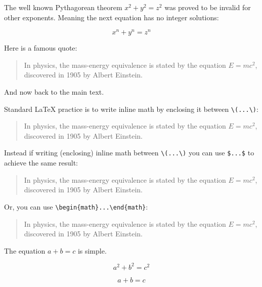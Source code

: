 \documentclass[12pt, letterpaper]{article}
\begin{document}
\newpage


The well known Pythagorean theorem \(x^2 + y^2 = z^2\) was 
proved to be invalid for other exponents. 
Meaning the next equation has no integer solutions:

\[ x^n + y^n = z^n \]


Here is a famous quote:

\begin{quote}
In physics, the mass-energy equivalence is stated 
by the equation \(E=mc^2\), discovered in 1905 by Albert Einstein.
\end{quote}

And now back to the main text.




\noindent Standard \LaTeX{} practice is to write inline math by enclosing it between \verb|\(...\)|:

\begin{quote}
In physics, the mass-energy equivalence is stated 
by the equation \(E=mc^2\), discovered in 1905 by Albert Einstein.
\end{quote}

\noindent Instead if writing (enclosing) inline math between \verb|\(...\)| you can use \texttt{\$...\$} to achieve the same result:

\begin{quote}
In physics, the mass-energy equivalence is stated 
by the equation $E=mc^2$, discovered in 1905 by Albert Einstein.
\end{quote}

\noindent Or, you can use \verb|\begin{math}...\end{math}|:

\begin{quote}
In physics, the mass-energy equivalence is stated 
by the equation \begin{math}E=mc^2\end{math}, discovered in 1905 by Albert Einstein.
\end{quote}








\newpage

The equation $a + b = c$ is simple.

\[ a^2 + b^2 = c^2\]


\begin{equation}
	a + b = c
\end{equation}
\end{document}
